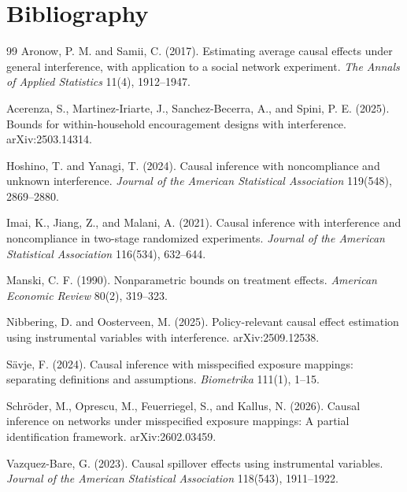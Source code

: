 \documentclass[11pt]{article}
\theoremstyle{definition}
\theoremstyle{plain}
\theoremstyle{remark}
\begin{document}
\section*{Bibliography}
\begin{thebibliography}{99}
Aronow, P. M. and Samii, C. (2017).
Estimating average causal effects under general interference, with application to a social network experiment.
\emph{The Annals of Applied Statistics} 11(4), 1912--1947.

Acerenza, S., Martinez-Iriarte, J., Sanchez-Becerra, A., and Spini, P. E. (2025).
Bounds for within-household encouragement designs with interference.
arXiv:2503.14314.

Hoshino, T. and Yanagi, T. (2024).
Causal inference with noncompliance and unknown interference.
\emph{Journal of the American Statistical Association} 119(548), 2869--2880.

Imai, K., Jiang, Z., and Malani, A. (2021).
Causal inference with interference and noncompliance in two-stage randomized experiments.
\emph{Journal of the American Statistical Association} 116(534), 632--644.

Manski, C. F. (1990).
Nonparametric bounds on treatment effects.
\emph{American Economic Review} 80(2), 319--323.

Nibbering, D. and Oosterveen, M. (2025).
Policy-relevant causal effect estimation using instrumental variables with interference.
arXiv:2509.12538.

S\"avje, F. (2024).
Causal inference with misspecified exposure mappings: separating definitions and assumptions.
\emph{Biometrika} 111(1), 1--15.

Schr\"oder, M., Oprescu, M., Feuerriegel, S., and Kallus, N. (2026).
Causal inference on networks under misspecified exposure mappings: A partial identification framework.
arXiv:2602.03459.

Vazquez-Bare, G. (2023).
Causal spillover effects using instrumental variables.
\emph{Journal of the American Statistical Association} 118(543), 1911--1922.
\end{thebibliography}
\end{document}
